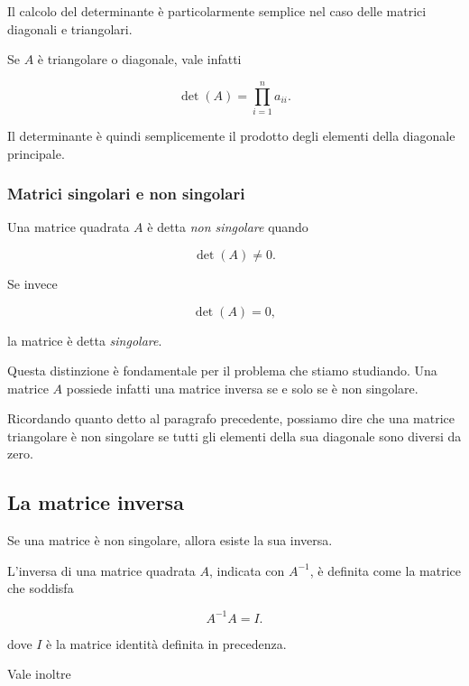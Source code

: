 Il calcolo del determinante è particolarmente semplice nel caso
delle matrici diagonali e triangolari.

Se $A$ è triangolare o diagonale, vale infatti

\begin{equation*}
\det(A)=\prod_{i=1}^{n}a_{ii}.
\label{eq:det_triangolare}
\end{equation*}

Il determinante è quindi semplicemente il prodotto degli elementi
della diagonale principale.



\subsubsection{Matrici singolari e non singolari}

Una matrice quadrata $A$ è detta \emph{non singolare} quando

\begin{equation*}
\det(A)\neq 0.
\end{equation*}

Se invece

\begin{equation*}
\det(A)=0,
\end{equation*}

la matrice è detta \emph{singolare}.

Questa distinzione è fondamentale per il problema che stiamo
studiando. Una matrice $A$ possiede infatti una matrice inversa
se e solo se è non singolare.

Ricordando quanto detto al paragrafo precedente, possiamo dire che una matrice triangolare è non singolare se tutti gli elementi della sua diagonale sono diversi da zero.

\subsection{La matrice inversa}

Se una matrice è non singolare, allora esiste la sua inversa.

L'inversa di una matrice quadrata $A$, indicata con $A^{-1}$,
è definita come la matrice che soddisfa

\begin{equation*}
A^{-1}A=I.
\end{equation*}

dove $I$ è la matrice identità definita in precedenza.

Vale inoltre

